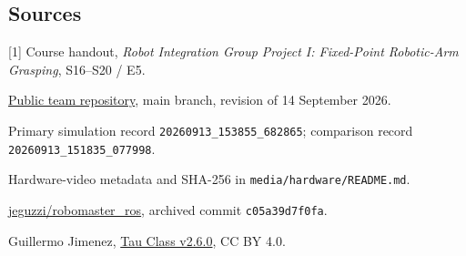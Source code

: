\documentclass[9pt,a4paper,twocolumn,twoside]{tau-class/tau}
\newcommand{\codepath}[1]{{\small\ttfamily\nolinkurl{#1}}}
\begin{document}
\subsection{Sources}
{\footnotesize
[1] Course handout, \emph{Robot Integration Group Project I: Fixed-Point
Robotic-Arm Grasping}, S16--S20 / E5.\par
[2] \href{https://github.com/ccx8kg5qpd-debug/robomaster-ep-fixed-point-grasping}
{Public team repository}, main branch, revision of 14 September 2026.\par
[3] Primary simulation record \codepath{20260913_153855_682865}; comparison
record \codepath{20260913_151835_077998}.\par
[4] Hardware-video metadata and SHA-256 in
\codepath{media/hardware/README.md}.\par
[5] \href{https://github.com/jeguzzi/robomaster_ros}{jeguzzi/robomaster\_ros},
archived commit \codepath{c05a39d7f0fa}.\par
[6] Guillermo Jimenez,
\href{https://github.com/MemoJimenez/Tau-class}{Tau Class v2.6.0}, CC BY 4.0.\par
}
\end{document}
